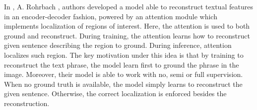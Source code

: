In \cite{rohrbach2016grounding}, A. Rohrbach \etal{}, authors
developed a model able to reconstruct textual features in an
encoder-decoder fashion, powered by an attention module which
implements localization of regions of interest. Here, the attention is
used to both ground and reconstruct. During training, the attention
learns how to reconstruct given sentence describing the region to
ground. During inference, attention localizes such region. The key
motivation under this idea is that by training to reconstruct the text
phrase, the model learn first to ground the phrase in the image.
Moreover, their model is able to work with no, semi or full
supervision. When no ground truth is available, the model simply
learns to reconstruct the given sentence. Otherwise, the correct
localization is enforced besides the reconstruction.

